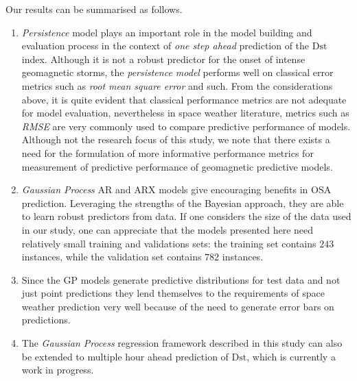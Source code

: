 Our results can be summarised as follows.
\begin{enumerate}
      \item \emph{Persistence} model plays an important role in the model building and evaluation 
      process in the context of \emph{one step ahead} prediction of the $\mathrm{Dst}$ index. 
      Although it is not a robust predictor for the onset of intense geomagnetic storms, the 
      \emph{persistence model} performs well on classical error metrics such as 
      \emph{root mean square error} and such. From the considerations above, it is quite evident 
      that classical performance metrics are not adequate for model evaluation, nevertheless in 
      space weather literature, metrics such as \emph{RMSE} are very commonly used to compare 
      predictive performance of models. Although not the research focus of this study, we note that 
      there exists a need for the formulation of more informative performance metrics for 
      measurement of predictive performance of geomagnetic predictive models.
      
      \item \emph{Gaussian Process} AR and ARX models give encouraging benefits in OSA prediction. 
      Leveraging the strengths of the Bayesian approach, they are able to learn robust predictors 
      from data. If one considers the size of the data used in our study, one can appreciate that 
      the models presented here need relatively small training and validations sets: the training 
      set contains $243$ instances, while the validation set contains $782$ instances.
      
      \item Since the GP models generate predictive distributions for test data and not just point 
      predictions they lend themselves to the requirements of space weather prediction very well 
      because of the need to generate error bars on predictions.
      
      \item The \emph{Gaussian Process} regression framework described in this study can also be 
      extended to multiple hour ahead prediction of $ \mathrm{Dst}$, which is currently a work in 
      progress.
\end{enumerate}





%
%
%
%
%

